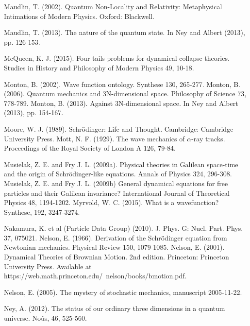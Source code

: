 \begin{thebibliography}{}
\bibitem{} Maudlin, T. (2002). Quantum Non-Locality and Relativity: Metaphysical Intimations of Modern Physics. Oxford: Blackwell.

\bibitem{} Maudlin, T. (2013). The nature of the quantum state. In Ney and Albert (2013), pp. 126-153.

\bibitem{}  McQueen, K. J. (2015). Four tails problems for dynamical collapse theories. Studies in History and Philosophy of Modern Physics 49, 10-18.


\bibitem{} Monton, B. (2002). Wave function ontology. Synthese 130, 265-277.
\bibitem{} Monton, B. (2006). Quantum mechanics and 3N-dimensional space. Philosophy of Science 73, 778-789.
\bibitem{} Monton, B. (2013). Against 3N-dimensional space. In Ney and Albert (2013), pp. 154-167.

\bibitem{} Moore, W. J. (1989). Schr\"{o}dinger: Life and Thought. Cambridge: Cambridge University Press.
\bibitem{} Mott, N. F. (1929). The wave mechanics of $\alpha$-ray tracks. Proceedings of the Royal Society of London A 126, 79-84. 


\bibitem{} Musielak, Z. E. and Fry J. L. (2009a). Physical theories in Galilean space-time and the origin
of Schr\"{o}dinger-like equations. Annals of Physics 324, 296-308.
\bibitem{} Musielak, Z. E. and Fry J. L. (2009b) General dynamical equations for free particles and their Galilean invariance? International Journal of Theoretical Physics 48, 1194-1202.
\bibitem{} Myrvold, W. C. (2015). What is a wavefunction? Synthese, 192, 3247-3274.

\bibitem{} Nakamura, K. et al (Particle Data Group) (2010). J. Phys. G: Nucl. Part. Phys. 37, 075021.
\bibitem{} Nelson, E. (1966). Derivation of the Schr\"{o}dinger equation from Newtonian mechanics. Physical Review 150, 1079-1085.
\bibitem{} Nelson, E. (2001).  Dynamical Theories of Brownian Motion. 2nd edition. Princeton: Princeton University Press. Available at https://web.math.princeton.edu/~nelson/books/bmotion.pdf.

\bibitem{} Nelson, E. (2005). The mystery of stochastic mechanics, manuscript 2005-11-22.

\bibitem{} Ney, A. (2012). The status of our ordinary three dimensions in a quantum universe. No\^{u}s, 46, 525-560.


\end{thebibliography}
